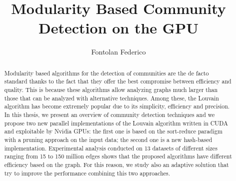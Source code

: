 \documentclass[12pt,a4paper,titlepage]{article}
\title{Modularity Based Community Detection on the GPU}
\author{Fontolan Federico}
\begin{document}
	
	
	\begin{abstract}
		Modularity based algorithms for the detection of communities are the de facto standard thanks to the fact that they offer the best compromise between efficiency and quality. 
		This is because these algorithms allow analyzing graphs much larger than those that can be analyzed with alternative techniques. Among these, the Louvain algorithm has become extremely popular due to its simplicity, efficiency and precision.
		In this thesis, we present an overview of community detection techniques and we propose two new parallel implementations of the Louvain algorithm written in CUDA and exploitable by Nvidia GPUs: the first one is based on the sort-reduce paradigm with a pruning approach on the input data; the second one is a new hash-based implementation. Experimental analysis conducted on 13 datasets of different sizes ranging from 15 to 150 million edges shows that the proposed algorithms have different efficiency based on the graph. For this reason, we study also an adaptive solution that try to improve the performance combining this two approaches. 
	\end{abstract}

	\tableofcontents
	\newpage
	
	\newpage
	
	\newpage
	
	\newpage
	
	\newpage
	
	\newpage
	
	\newpage
	
	\newpage
	\printbibliography
\end{document}
